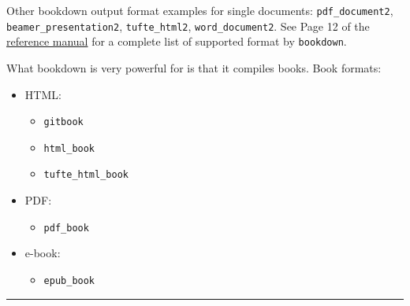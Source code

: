 \documentclass[
  a4paper,
  twoside,
  openright]{book}
\providecommand{\tightlist}{%
  \setlength{\itemsep}{0pt}\setlength{\parskip}{0pt}}
\theoremstyle{definition}
\theoremstyle{definition}
\theoremstyle{definition}
\theoremstyle{definition}
\theoremstyle{remark}
\begin{document}
Other bookdown output format examples for single documents: \texttt{pdf\_document2}, \texttt{beamer\_presentation2}, \texttt{tufte\_html2}, \texttt{word\_document2}. See Page 12 of the \href{https://cran.r-project.org/web/packages/bookdown/bookdown.pdf}{reference manual} for a complete list of supported format by \texttt{bookdown}.

What bookdown is very powerful for is that it compiles books. Book formats:

\begin{itemize}
\tightlist
\item
  HTML:

  \begin{itemize}
  \tightlist
  \item
    \texttt{gitbook}
  \item
    \texttt{html\_book}
  \item
    \texttt{tufte\_html\_book}
  \end{itemize}
\item
  PDF:

  \begin{itemize}
  \tightlist
  \item
    \texttt{pdf\_book}
  \end{itemize}
\item
  e-book:

  \begin{itemize}
  \tightlist
  \item
    \texttt{epub\_book}
  \end{itemize}
\end{itemize}

\begin{center}\rule{0.5\linewidth}{0.5pt}\end{center}
\end{document}
